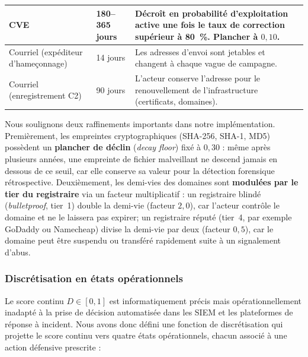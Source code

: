 \begin{table}[ht]
\begin{tabular}{|l|l|p{7.5cm}|}
\hline
CVE & 180--365 jours & Décroît en probabilité d'exploitation active une fois le taux de correction supérieur à 80~\%. Plancher à $0{,}10$. \\
\hline
Courriel (expéditeur d'hameçonnage) & 14 jours & Les adresses d'envoi sont jetables et changent à chaque vague de campagne. \\
\hline
Courriel (enregistrement C2) & 90 jours & L'acteur conserve l'adresse pour le renouvellement de l'infrastructure (certificats, domaines). \\
\hline
\end{tabular}
\end{table}

Nous soulignons deux raffinements importants dans notre implémentation. Premièrement, les empreintes cryptographiques (SHA-256, SHA-1, MD5) possèdent un \textbf{plancher de déclin} (\textit{decay floor}) fixé à $0{,}30$ : même après plusieurs années, une empreinte de fichier malveillant ne descend jamais en dessous de ce seuil, car elle conserve sa valeur pour la détection forensique rétrospective. Deuxièmement, les demi-vies des domaines sont \textbf{modulées par le tier du registraire} via un facteur multiplicatif : un registraire blindé (\textit{bulletproof}, tier~1) double la demi-vie (facteur $2{,}0$), car l'acteur contrôle le domaine et ne le laissera pas expirer; un registraire réputé (tier~4, par exemple GoDaddy ou Namecheap) divise la demi-vie par deux (facteur $0{,}5$), car le domaine peut être suspendu ou transféré rapidement suite à un signalement d'abus.

\subsubsection{Discrétisation en états opérationnels}

Le score continu $D \in [0, 1]$ est informatiquement précis mais opérationnellement inadapté à la prise de décision automatisée dans les SIEM et les plateformes de réponse à incident. Nous avons donc défini une fonction de discrétisation qui projette le score continu vers quatre états opérationnels, chacun associé à une action défensive prescrite :

